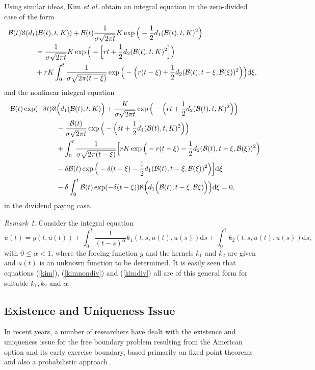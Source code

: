 \documentclass[fleqn,final,3p,11pt]{elsarticle}
\theoremstyle{definition}
\theoremstyle{remark}
\newtheorem{remark}[theorem]{Remark}
\numberwithin{equation}{section}
\begin{document}
Using similar ideas, Kim \textit{ et al.} \cite{kim2}  obtain an integral equation in the zero-divided case of the form
\begin{align}\label{kimnondiv}
\mathcal{B}(t) \aleph(d_{1}&(\mathcal{B}(t),t, K))+\mathcal{B}(t) \frac{1}{\sigma\sqrt{2\pi t}}K\exp\Big( -\frac{1}{2}d_{1}(\mathcal{B}(t),t, K)^{2}\Big) \notag\\
&= \frac{1}{\sigma \sqrt{2\pi t}}K\exp\Big( -\Big[rt + \frac{1}{2} d_{2}(\mathcal{B}(t),t, K)^{2}\Big]\Big)\notag\\
&+ rK\int_{0}^{t}\frac{1}{\sigma\sqrt{2\pi (t-\xi)}} \exp\Big(-\Big(r(t-\xi)+ \frac{1}{2}d_{2}(\mathcal{B}(t),t-\xi, \mathcal{B}(\xi) )^{2}\Big)\Big)\mathrm{d}\xi,
\end{align}
and the nonlinear integral equation
\begin{align}\label{kimdiv}
-\mathcal{B}(t)\exp(-\delta t) \aleph &\Big(d_{1}(\mathcal{B}(t),t, K)\Big) +\frac{K}{\sigma \sqrt{2\pi t}} \exp \Big(- \Big(rt + \frac{1}{2}d_{2}(\mathcal{B}(t),t, K)^{2}\Big)  \Big)\notag\\
& -\frac{\mathcal{B}(t)}{\sigma \sqrt{2\pi t}} \exp \Big(-\Big (\delta t + \frac{1}{2}d_{1}(\mathcal{B}(t),t, K)^{2}\Big)  \Big)\notag\\
&+\int_{0}^{t}\frac{1}{\sigma \sqrt{2\pi (t-\xi)}}\Big[ rK \exp \Big(- r(t-\xi) - \frac{1}{2} d_{2}(\mathcal{B}(t),t-\xi, \mathcal{B}(\xi))^{2}\Big)\notag\\
&-\delta \mathcal{B}(t) \exp \Big(- \delta(t-\xi) - \frac{1}{2} d_{1}(\mathcal{B}(t),t-\xi, \mathcal{B}(\xi))^{2}\Big)\Big] \mathrm{d}\xi \notag \\
&- \delta \int_{0}^{t} \mathcal{B}(t) \exp(-\delta (t - \xi))  \aleph \Big(d_{1} \Big(\mathcal{B}(t), t-\xi, \mathcal{B}\xi)\Big)\Big)\mathrm{d}\xi = 0,
\end{align}
in the dividend paying case.
\begin{remark}
Consider the integral equation
\begin{equation}\label{asli}
u(t)=g(t,u(t))+\int_{0}^{t}\frac{1}{(t-s)^{\alpha}}k_{1}(t,s,u(t),u(s))\mathrm{d}s+\int_{0}^{t}k_{2}(t,s,u(t),u(s))\mathrm{d}s,
\end{equation}
with $0\leq\alpha <1$, where the forcing function $ g $ and the kernels $k_{1}$ and  $k_{2}$ are given and $ u(t) $ is an unknown function to be determined. It is easily seen that equations (\ref{kim}), (\ref{kimnondiv}) and (\ref{kimdiv}) all are of this general form for suitable
$k_{1},k_{2}$ and $\alpha$.
\end{remark}
\subsection{Existence and Uniqueness Issue}
In recent years, a number of researchers have dealt with the existence and uniqueness issue for the free boundary problem resulting from the American option and its early exercise boundary, based primarily on fixed point theorems and also a probabilistic approach \cite{chen,jacka,peskir,myneni} .
\end{document}
